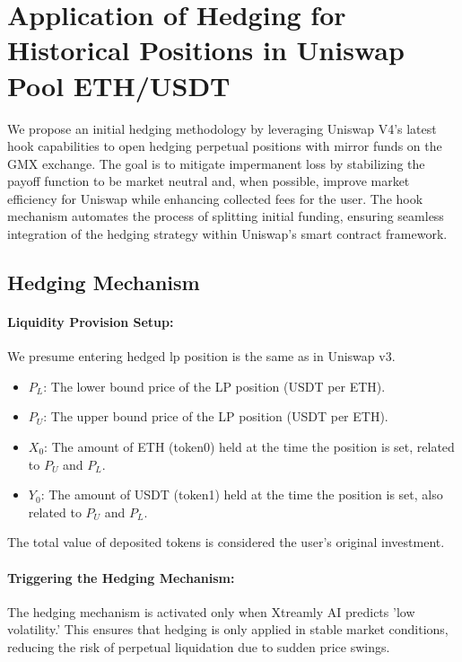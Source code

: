 \documentclass[12pt]{article}
\begin{document}
\section{Application of Hedging for Historical Positions in Uniswap Pool ETH/USDT}
\label{sec:hedgingmechanism}

We propose an initial hedging methodology by leveraging Uniswap V4's latest hook capabilities to open hedging perpetual positions with mirror funds on the GMX exchange. The goal is to mitigate impermanent loss by stabilizing the payoff function to be market neutral and, when possible, improve market efficiency for Uniswap while enhancing collected fees for the user. The hook mechanism automates the process of splitting initial funding, ensuring seamless integration of the hedging strategy within Uniswap’s smart contract framework.

\subsection{Hedging Mechanism}

\paragraph{Liquidity Provision Setup:} 
We presume entering hedged lp position is the same as in Uniswap v3.
\begin{itemize}
    \item $P_L$: The lower bound price of the LP position (USDT per ETH).
    \item $P_U$: The upper bound price of the LP position (USDT per ETH).
    \item $X_0$: The amount of ETH (token0) held at the time the position is set, related to $P_U$ and $P_L$.
    \item $Y_0$: The amount of USDT (token1) held at the time the position is set, also related to $P_U$ and $P_L$.
\end{itemize}
The total value of deposited tokens is considered the user's original investment.

\paragraph{Triggering the Hedging Mechanism:} 
The hedging mechanism is activated only when Xtreamly AI predicts 'low volatility.' This ensures that hedging is only applied in stable market conditions, reducing the risk of perpetual liquidation due to sudden price swings.
\end{document}
